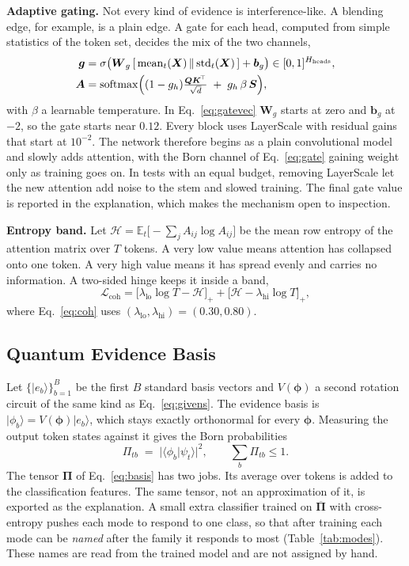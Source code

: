 \documentclass[conference]{IEEEtran}
\newcommand{\bs}[1]{\boldsymbol{#1}}
\newcommand{\ket}[1]{\lvert #1 \rangle}
\newcommand{\braket}[2]{\langle #1 \vert #2 \rangle}
\newcommand{\sub}[1]{\subsection{\texorpdfstring{\textbf{#1}}{#1}}}
\begin{document}
\textbf{Adaptive gating.} Not every kind of evidence is interference-like. A blending
edge, for example, is a plain edge. A gate for each head, computed from simple
statistics of the token set, decides the mix of the two channels,
\begin{align}
\bs{g} &= \sigma\bigl(\bs{W}_{g}\,[\,\mathrm{mean}_t(\bs{X}) \,\Vert\, \mathrm{std}_t(\bs{X})\,] + \bs{b}_{g}\bigr) \in [0,1]^{H_{\text{heads}}},
\label{eq:gatevec}\\
\bs{A} &= \mathrm{softmax}\Bigl( (1-g_{h})\tfrac{\bs{Q}\bs{K}^{\!\top}}{\sqrt{d}} \;+\; g_{h}\,\beta\, \bs{S} \Bigr),
\label{eq:gate}
\end{align}
with $\beta$ a learnable temperature. In Eq.~\eqref{eq:gatevec} $\bs{W}_{g}$ starts at
zero and $\bs{b}_{g}$ at $-2$, so the gate starts near $0.12$. Every block uses
LayerScale \cite{touvron2021cait} with residual gains that start at $10^{-2}$. The
network therefore begins as a plain convolutional model and slowly adds attention,
with the Born channel of Eq.~\eqref{eq:gate} gaining weight only as training goes on.
In tests with an equal budget, removing LayerScale let the new attention add noise to
the stem and slowed training. The final gate value is reported in the explanation,
which makes the mechanism open to inspection.

\textbf{Entropy band.} Let $\mathcal{H}=\mathbb{E}_{t}\bigl[-\sum_{j}A_{ij}\log
A_{ij}\bigr]$ be the mean row entropy of the attention matrix over $T$ tokens. A very
low value means attention has collapsed onto one token. A very high value means it
has spread evenly and carries no information. A two-sided hinge keeps it inside a band,
\begin{equation}
\mathcal{L}_{\text{coh}} = \bigl[\lambda_{\text{lo}}\log T - \mathcal{H}\bigr]_{+}
+ \bigl[\mathcal{H} - \lambda_{\text{hi}}\log T\bigr]_{+},
\label{eq:coh}
\end{equation}
where Eq.~\eqref{eq:coh} uses $(\lambda_{\text{lo}},\lambda_{\text{hi}})=(0.30,0.80)$.

\sub{Quantum Evidence Basis}
Let $\{\ket{e_{b}}\}_{b=1}^{B}$ be the first $B$ standard basis vectors and
$V(\bs{\phi})$ a second rotation circuit of the same kind as Eq.~\eqref{eq:givens}.
The evidence basis is $\ket{\phi_{b}} = V(\bs{\phi})\ket{e_{b}}$, which stays exactly
orthonormal for every $\bs{\phi}$. Measuring the output token states against it gives
the Born probabilities
\begin{equation}
\Pi_{tb} \;=\; \bigl\lvert \braket{\phi_{b}}{\psi_{t}} \bigr\rvert^{2},
\qquad \textstyle\sum_{b}\Pi_{tb}\le 1 .
\label{eq:basis}
\end{equation}
The tensor $\bs{\Pi}$ of Eq.~\eqref{eq:basis} has two jobs. Its average over tokens is
added to the classification features. The same tensor, not an approximation of it, is
exported as the explanation. A small extra classifier trained on
$\overline{\bs{\Pi}}$ with cross-entropy pushes each mode to respond to one class, so
that after training each mode can be \emph{named} after the family it responds to
most (Table~\ref{tab:modes}). These names are read from the trained model and are not
assigned by hand.
\end{document}
